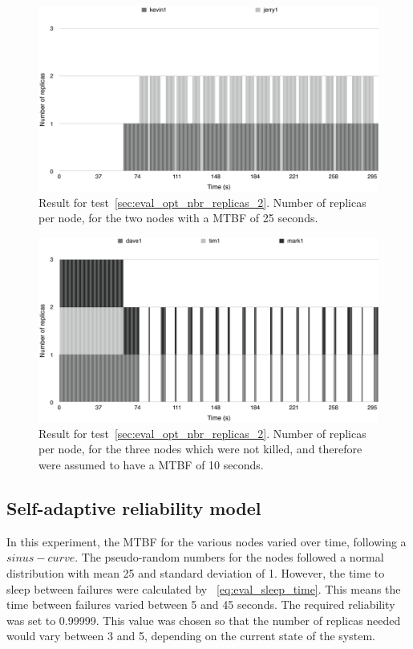 \documentclass{cslthse-msc}
\begin{document}
\begin{figure}[!hbt]
\centering
\includegraphics[scale=0.5]{images/results/optimal_replicas/2/MTBF_25.pdf}
\caption{Result for test~\ref{sec:eval_opt_nbr_replicas_2}. Number of replicas per node, for the two nodes with a MTBF of 25 seconds.} \label{fig:exp_opt_replicas_MTBF_25_2}
\end{figure}

\begin{figure}[!hbt]
\centering
\includegraphics[scale=0.5]{images/results/optimal_replicas/2/MTBF_10.pdf}
\caption{Result for test~\ref{sec:eval_opt_nbr_replicas_2}. Number of replicas per node, for the three nodes which were not killed, and therefore were assumed to have a MTBF of 10 seconds.} \label{fig:exp_opt_replicas_MTBF_10_2}
\end{figure}


\subsection{Self-adaptive reliability model} \label{sec:eval_adaptive_rel_model}
In this experiment, the MTBF for the various nodes varied over time, following a $sinus-curve$. The pseudo-random numbers for the nodes followed a normal distribution with mean 25 and standard deviation of 1. However, the time to sleep between failures were calculated by ~\ref{eq:eval_sleep_time}. This means the time between failures varied between 5 and 45 seconds. The required reliability was set to 0.99999. This value was chosen so that the number of replicas needed would vary between 3 and 5, depending on the current state of the system.
\end{document}
